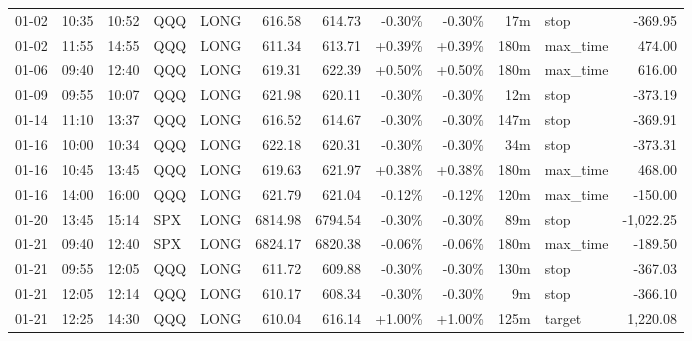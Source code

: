 \documentclass[11pt,a4paper]{article}
\begin{document}
\begin{center}
\begin{longtable}{>{\color{txtmain}}l l l l l r r r r r >{\color{txtmain}}l r}
01-02 & 10:35 & 10:52 & QQQ & LONG & 616.58 & 614.73 & \textcolor{lossred}{-0.30\%} & \textcolor{lossred}{-0.30\%} & 17m & stop & \textcolor{lossred}{-369.95} \\
01-02 & 11:55 & 14:55 & QQQ & LONG & 611.34 & 613.71 & \textcolor{wingreen}{+0.39\%} & \textcolor{wingreen}{+0.39\%} & 180m & max\_time & \textcolor{wingreen}{474.00} \\
01-06 & 09:40 & 12:40 & QQQ & LONG & 619.31 & 622.39 & \textcolor{wingreen}{+0.50\%} & \textcolor{wingreen}{+0.50\%} & 180m & max\_time & \textcolor{wingreen}{616.00} \\
01-09 & 09:55 & 10:07 & QQQ & LONG & 621.98 & 620.11 & \textcolor{lossred}{-0.30\%} & \textcolor{lossred}{-0.30\%} & 12m & stop & \textcolor{lossred}{-373.19} \\
01-14 & 11:10 & 13:37 & QQQ & LONG & 616.52 & 614.67 & \textcolor{lossred}{-0.30\%} & \textcolor{lossred}{-0.30\%} & 147m & stop & \textcolor{lossred}{-369.91} \\
01-16 & 10:00 & 10:34 & QQQ & LONG & 622.18 & 620.31 & \textcolor{lossred}{-0.30\%} & \textcolor{lossred}{-0.30\%} & 34m & stop & \textcolor{lossred}{-373.31} \\
01-16 & 10:45 & 13:45 & QQQ & LONG & 619.63 & 621.97 & \textcolor{wingreen}{+0.38\%} & \textcolor{wingreen}{+0.38\%} & 180m & max\_time & \textcolor{wingreen}{468.00} \\
01-16 & 14:00 & 16:00 & QQQ & LONG & 621.79 & 621.04 & \textcolor{lossred}{-0.12\%} & \textcolor{lossred}{-0.12\%} & 120m & max\_time & \textcolor{lossred}{-150.00} \\
01-20 & 13:45 & 15:14 & SPX & LONG & 6814.98 & 6794.54 & \textcolor{lossred}{-0.30\%} & \textcolor{lossred}{-0.30\%} & 89m & stop & \textcolor{lossred}{-1,022.25} \\
01-21 & 09:40 & 12:40 & SPX & LONG & 6824.17 & 6820.38 & \textcolor{lossred}{-0.06\%} & \textcolor{lossred}{-0.06\%} & 180m & max\_time & \textcolor{lossred}{-189.50} \\
01-21 & 09:55 & 12:05 & QQQ & LONG & 611.72 & 609.88 & \textcolor{lossred}{-0.30\%} & \textcolor{lossred}{-0.30\%} & 130m & stop & \textcolor{lossred}{-367.03} \\
01-21 & 12:05 & 12:14 & QQQ & LONG & 610.17 & 608.34 & \textcolor{lossred}{-0.30\%} & \textcolor{lossred}{-0.30\%} & 9m & stop & \textcolor{lossred}{-366.10} \\
01-21 & 12:25 & 14:30 & QQQ & LONG & 610.04 & 616.14 & \textcolor{wingreen}{+1.00\%} & \textcolor{wingreen}{+1.00\%} & 125m & target & \textcolor{wingreen}{1,220.08} \\

\end{longtable}
\end{center}
\end{document}
